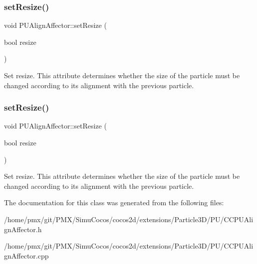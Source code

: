 \subsubsection{\texorpdfstring{set\+Resize()}{setResize()}\hspace{0.1cm}{\footnotesize\ttfamily [1/2]}}
{\footnotesize\ttfamily void P\+U\+Align\+Affector\+::set\+Resize (\begin{DoxyParamCaption}\item[{bool}]{resize }\end{DoxyParamCaption})}

Set resize. This attribute determines whether the size of the particle must be changed according to its alignment with the previous particle. \mbox{\label{classPUAlignAffector_a217e42a696450708afac9f4ba0473181}} 
\subsubsection{\texorpdfstring{set\+Resize()}{setResize()}\hspace{0.1cm}{\footnotesize\ttfamily [2/2]}}
{\footnotesize\ttfamily void P\+U\+Align\+Affector\+::set\+Resize (\begin{DoxyParamCaption}\item[{bool}]{resize }\end{DoxyParamCaption})}

Set resize. This attribute determines whether the size of the particle must be changed according to its alignment with the previous particle. 

The documentation for this class was generated from the following files\+:\begin{DoxyCompactItemize}
\item 
/home/pmx/git/\+P\+M\+X/\+Simu\+Cocos/cocos2d/extensions/\+Particle3\+D/\+P\+U/C\+C\+P\+U\+Align\+Affector.\+h\item 
/home/pmx/git/\+P\+M\+X/\+Simu\+Cocos/cocos2d/extensions/\+Particle3\+D/\+P\+U/C\+C\+P\+U\+Align\+Affector.\+cpp\end{DoxyCompactItemize}
